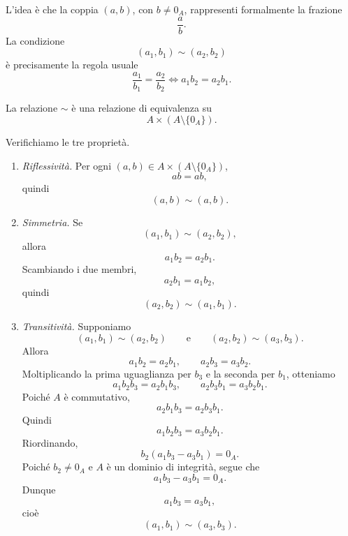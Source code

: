 \documentclass[a4paper]{article}
\begin{document}
\begin{radioactive}
L'idea è che la coppia \((a,b)\), con \(b\neq 0_A\), rappresenti formalmente la frazione
\[
    \frac{a}{b}.
\]
La condizione
\[
    (a_1,b_1)\sim(a_2,b_2)
\]
è precisamente la regola usuale
\[
    \frac{a_1}{b_1}=\frac{a_2}{b_2}
    \iff
    a_1b_2=a_2b_1.
\]
\end{radioactive}

\begin{radioactive}
\begin{snippetproposition}{}
    La relazione \(\sim\) è una relazione di equivalenza su
    \[
        A\times(A\setminus\{0_A\}).
    \]
\end{snippetproposition}
\end{radioactive}

\begin{radioactive}
\begin{snippetproof}{}
    Verifichiamo le tre proprietà.
    \begin{enumerate}
        \item \emph{Riflessività.}
        Per ogni \((a,b)\in A\times(A\setminus\{0_A\})\),
        \[
            ab=ab,
        \]
        quindi
        \[
            (a,b)\sim(a,b).
        \]
        \item \emph{Simmetria.}
        Se
        \[
            (a_1,b_1)\sim(a_2,b_2),
        \]
        allora
        \[
            a_1b_2=a_2b_1.
        \]
        Scambiando i due membri,
        \[
            a_2b_1=a_1b_2,
        \]
        quindi
        \[
            (a_2,b_2)\sim(a_1,b_1).
        \]
        \item \emph{Transitività.}
        Supponiamo
        \[
            (a_1,b_1)\sim(a_2,b_2)
            \qquad
            \text{e}
            \qquad
            (a_2,b_2)\sim(a_3,b_3).
        \]
        Allora
        \[
            a_1b_2=a_2b_1,
            \qquad
            a_2b_3=a_3b_2.
        \]
        Moltiplicando la prima uguaglianza per \(b_3\) e la seconda per \(b_1\), otteniamo
        \[
            a_1b_2b_3=a_2b_1b_3,
            \qquad
            a_2b_3b_1=a_3b_2b_1.
        \]
        Poiché \(A\) è commutativo,
        \[
            a_2b_1b_3=a_2b_3b_1.
        \]
        Quindi
        \[
            a_1b_2b_3=a_3b_2b_1.
        \]
        Riordinando,
        \[
            b_2(a_1b_3-a_3b_1)=0_A.
        \]
        Poiché \(b_2\neq 0_A\) e \(A\) è un dominio di integrità, segue che
        \[
            a_1b_3-a_3b_1=0_A.
        \]
        Dunque
        \[
            a_1b_3=a_3b_1,
        \]
        cioè
        \[
            (a_1,b_1)\sim(a_3,b_3).
        \]
    \end{enumerate}
\end{snippetproof}
\end{radioactive}
\end{document}

